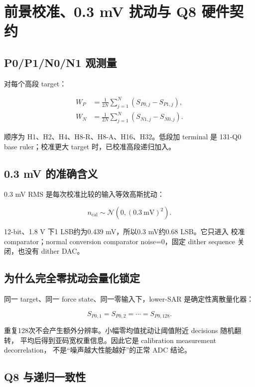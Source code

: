 \documentclass[UTF8,11pt,a4paper]{ctexart}
\begin{document}
\section[前景校准与 Q8 契约]{前景校准、0.3 mV 扰动与 Q8 硬件契约}

\subsection{P0/P1/N0/N1 观测量}

对每个高段 target：

\[
\begin{aligned}
  W_P &=
  \frac{1}{2N}\sum_{j=1}^{N}\left(S_{P0,j}-S_{P1,j}\right),\\
  W_N &=
  \frac{1}{2N}\sum_{j=1}^{N}\left(S_{N1,j}-S_{N0,j}\right).
\end{aligned}
\]

顺序为 H1、H2、H4、H8-R、H8-A、H16、H32。低段加 terminal 是
131-Q0 base ruler；校准更大 target 时，已校准高段递归加入。

\subsection{0.3 mV 的准确含义}

0.3 mV RMS 是每次校准比较的输入等效高斯扰动：

\[
  n_{\mathrm{cal}}\sim\mathcal{N}\left(0,(0.3\ \mathrm{mV})^2\right).
\]

12-bit、1.8 V 下1 LSB约为0.439 mV，所以0.3 mV约0.68 LSB。它只进入
校准 comparator；normal conversion comparator noise=0，固定 dither
sequence 关闭，也没有 dither DAC。

\subsection{为什么完全零扰动会量化锁定}

同一 target、同一 force state、同一零输入下，lower-SAR 是确定性离散量化器：

\[
  S_{P0,1}=S_{P0,2}=\cdots=S_{P0,128}.
\]

重复128次不会产生额外分辨率。小幅零均值扰动让阈值附近 decisions 随机翻转，
平均后得到亚码宽权重信息。因此它是 calibration measurement decorrelation，
不是“噪声越大性能越好”的正常 ADC 结论。

\subsection{Q8 与递归一致性}
\end{document}
